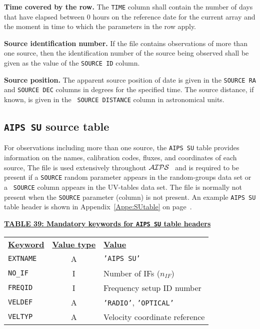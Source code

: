 \documentclass[twoside]{article}
\newcommand{\Me}[1]{\textcolor{mecol}{#1}}
\newcommand{\AIPS}{{$\cal AIPS\/$}}
\newcommand{\nif}{$n_{IF}$}
\begin{document}
{\bf Time covered by the row.}  The {\tt TIME} column shall contain
the number of days that have elapsed between 0 hours on the reference
date for the current array and the moment in time to which the
parameters in the row apply.

{\bf Source identification number.} If the file contains observations
of more than one source, then the identification number of the source
being observed shall be given as the value of the {\tt SOURCE ID}
column.

{\bf Source position.}  The apparent source position of date is given
in the {\tt SOURCE RA} and {\tt SOURCE DEC} columns in degrees for the
specified time.  The source distance, if known, is given in the {\tt
  SOURCE DISTANCE} column in astronomical units.

\subsection{{\tt AIPS SU} source table}
\label{s:SU}

For observations including more than one source, the {\tt AIPS SU}
table provides information on the names, calibration codes, fluxes,
and coordinates of each source,  The file is used extensively
throughout \AIPS\ \Me{ and is required to be present if a {\tt SOURCE}
random parameter appears in the random-groups data set or a {\tt
SOURCE} column appears in the UV-tables data set.  The file is
normally not present when the {\tt SOURCE} parameter (column) is not
present}.  An example {\tt AIPS SU} table header is shown in
Appendix~\ref{Appe:SUtable} on page~\pageref{Appe:SUtable}.

\begin{center}
\underline{\bf{TABLE 39: Mandatory keywords for {\tt AIPS SU} table
    headers}}\\
\begin{tabular}{lcl}
\noalign{\vspace{2pt}} \label{ta:SUkeys}
\underline{{\bf Keyword}} & \underline{\bf{Value type}} &
    \underline{\bf{Value\vphantom{y}}} \\
\noalign{\vspace{2pt}}
{\tt EXTNAME}   & A & {\tt 'AIPS SU'}  \\
{\tt NO\_IF}    & I & Number of IFs (\nif)\\
{\tt FREQID}    & I & Frequency setup ID number \\
{\tt VELDEF}    & A & {\tt 'RADIO'}, {\tt 'OPTICAL'} \\
{\tt VELTYP}    & A & Velocity coordinate reference
\end{tabular}
\end{center}
\end{document}
